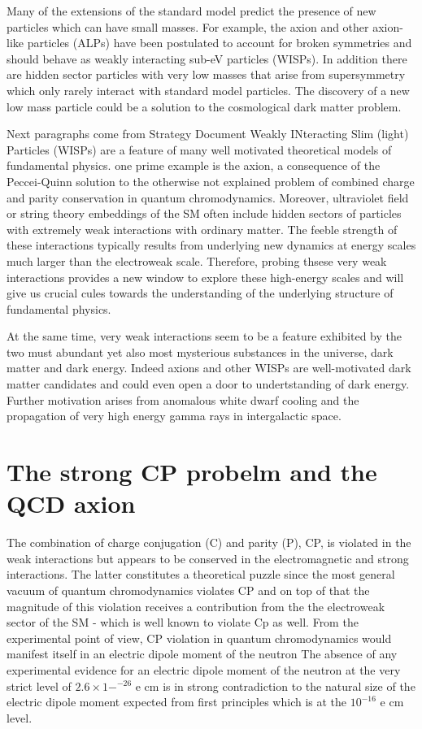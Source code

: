 \documentclass[11pt]{book}
\begin{document}
Many of the extensions of the standard model predict the presence of new particles which can have small masses. For example, the axion and other axion-like particles (ALPs) have been postulated to account for broken symmetries and should behave as weakly interacting sub-eV particles (WISPs). In addition there are hidden sector particles with very low masses that arise from supersymmetry which only rarely interact with standard model particles. The discovery of a new low mass particle  could be a solution to the cosmological dark matter problem.

{\color{blue} Next paragraphs come from Strategy Document}
Weakly INteracting Slim (light) Particles (WISPs) are a feature of many well motivated theoretical models of fundamental physics. one prime example is the axion, a consequence of the Peccei-Quinn solution to the otherwise not explained problem of combined charge and parity conservation in quantum chromodynamics. Moreover, ultraviolet field or string theory embeddings of the SM often include hidden sectors of particles with extremely weak interactions with ordinary matter. The feeble strength of these interactions typically results from underlying new dynamics at energy scales much larger than the electroweak scale. Therefore, probing thsese very weak interactions provides a new window to explore these high-energy scales and will give us crucial cules towards the understanding of the underlying structure of fundamental physics.

At the same time, very weak interactions seem to be a feature exhibited by the two must abundant yet also most mysterious substances in the universe, dark matter and dark energy. Indeed axions and other WISPs are well-motivated dark matter candidates and could even open a door to undertstanding of dark energy. Further motivation arises from anomalous white dwarf cooling and the propagation of very high energy gamma rays in intergalactic space.

\section{The strong CP probelm and the QCD axion}
The combination of charge conjugation (C) and parity (P), CP, is violated in the weak interactions but appears to be conserved in the electromagnetic and strong interactions. The latter constitutes a theoretical puzzle since the most general vacuum of quantum chromodynamics violates CP and on top of that the magnitude of this violation receives a contribution from the the electroweak sector of the SM - which is well known to violate Cp as well. From the experimental point of view, CP violation in quantum chromodynamics would manifest itself in an electric dipole moment of the neutron The absence of any experimental evidence for an electric dipole moment of the neutron at the very strict level of $2.6\times1-^{-26}$ e cm is in strong contradiction to the natural size of the electric dipole moment expected from first principles which is at the $10^{-16}$ e cm level.
\end{document}

